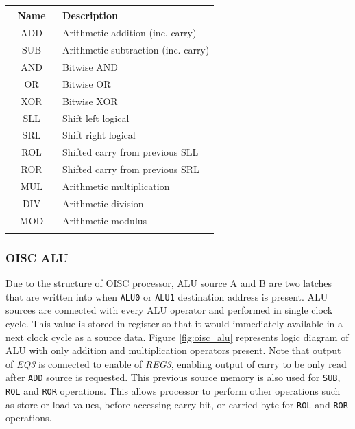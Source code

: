 \begin{blockpage}
	\begin{tabular}{| c | p{0.75\linewidth} |} \hline 
		\rowcolor[rgb]{0.82,0.82,0.82}
		Name & Description \\\hline
		\arrayrulecolor[rgb]{0.82,0.82,0.82}
		ADD & Arithmetic addition (inc. carry) \\\hline
		SUB & Arithmetic subtraction (inc. carry) \\\hline
		AND & Bitwise AND \\\hline
		OR  & Bitwise OR \\\hline
		XOR & Bitwise XOR \\\hline
		SLL & Shift left logical \\\hline
		SRL & Shift right logical \\\hline
		ROL & Shifted carry from previous SLL \\\hline
		ROR & Shifted carry from previous SRL \\\hline
		MUL & Arithmetic multiplication \\\hline
		DIV & Arithmetic division \\\hline
		MOD & Arithmetic modulus \\
		\arrayrulecolor[rgb]{0,0,0}\hline
	\end{tabular}
	\label{tab:alu_set}
\end{blockpage}

\subsubsection{OISC ALU}
Due to the structure of OISC processor, ALU source A and B are two latches that are written into when \texttt{ALU0} or \texttt{ALU1} destination address is present. ALU sources are connected with every ALU operator and performed in single clock cycle. This value is stored in register so that it would immediately available in a next clock cycle as a source data. Figure \ref{fig:oisc_alu} represents logic diagram of ALU with only addition and multiplication operators present. Note that output of \textit{EQ3} is connected to enable of \textit{REG3}, enabling output of carry to be only read after \texttt{ADD} source is requested. This previous source memory is also used for \texttt{SUB}, \texttt{ROL} and \texttt{ROR} operations. This allows processor to perform other operations such as store or load values, before accessing carry bit, or carried byte for \texttt{ROL} and \texttt{ROR} operations.


